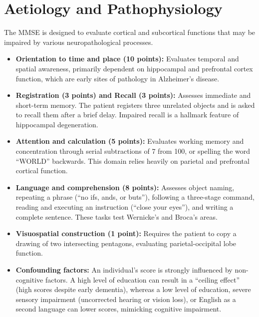 \section*{Aetiology and Pathophysiology}
The MMSE is designed to evaluate cortical and subcortical functions that may be impaired by various neuropathological processes.
\begin{itemize}
    \item \textbf{Orientation to time and place (10 points):} Evaluates temporal and spatial awareness, primarily dependent on hippocampal and prefrontal cortex function, which are early sites of pathology in Alzheimer's disease.
    \item \textbf{Registration (3 points) and Recall (3 points):} Assesses immediate and short-term memory. The patient registers three unrelated objects and is asked to recall them after a brief delay. Impaired recall is a hallmark feature of hippocampal degeneration.
    \item \textbf{Attention and calculation (5 points):} Evaluates working memory and concentration through serial subtractions of 7 from 100, or spelling the word ``WORLD'' backwards. This domain relies heavily on parietal and prefrontal cortical function.
    \item \textbf{Language and comprehension (8 points):} Assesses object naming, repeating a phrase (``no ifs, ands, or buts''), following a three-stage command, reading and executing an instruction (``close your eyes''), and writing a complete sentence. These tasks test Wernicke's and Broca's areas.
    \item \textbf{Visuospatial construction (1 point):} Requires the patient to copy a drawing of two intersecting pentagons, evaluating parietal-occipital lobe function.
    \item \textbf{Confounding factors:} An individual's score is strongly influenced by non-cognitive factors. A high level of education can result in a ``ceiling effect'' (high scores despite early dementia), whereas a low level of education, severe sensory impairment (uncorrected hearing or vision loss), or English as a second language can lower scores, mimicking cognitive impairment.
\end{itemize}

